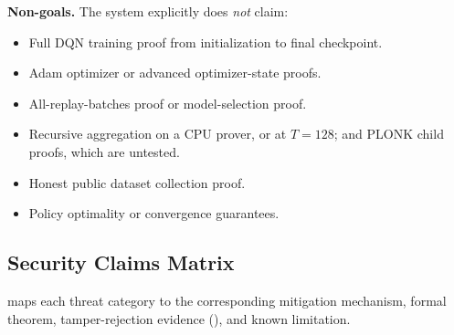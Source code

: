 \noindent\textbf{Non-goals.} The system explicitly does \emph{not} claim:
\begin{itemize}[leftmargin=1.5em]
  \item Full DQN training proof from initialization to final checkpoint.
  \item Adam optimizer or advanced optimizer-state proofs.
  \item All-replay-batches proof or model-selection proof.
  \item Recursive aggregation on a CPU prover, or at $T = 128$; and PLONK
  child proofs, which are untested.
  \item Honest public dataset collection proof.
  \item Policy optimality or convergence guarantees.
\end{itemize}

\subsection{Security Claims Matrix}

 maps each threat category to the corresponding
mitigation mechanism, formal theorem, tamper-rejection evidence
(), and known limitation.

